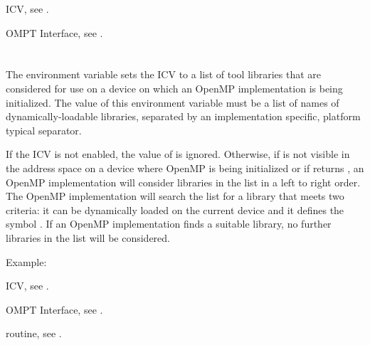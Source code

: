 \begin{crossrefs}
\item {} ICV, see .

\item OMPT Interface, see .
\end{crossrefs}



\section{}
\label{sec:OMP_TOOL_LIBRARIES}

The  environment variable sets the
 ICV to a list of tool libraries that are
considered for use on a device on which an OpenMP implementation
is being initialized. The value of this environment variable must 
be a list of names of dynamically-loadable libraries, separated 
by an implementation specific, platform typical separator.

If the  ICV is not enabled, the value of 
 is ignored. Otherwise, if  
is not visible in the address space on a device where OpenMP is being
initialized or if  returns , an OpenMP 
implementation will consider libraries in the  list
in a left to right order.  The OpenMP implementation will search the list for
a library that meets two criteria: it can be dynamically loaded on the 
current device and it defines the symbol . If an 
OpenMP implementation finds a suitable library, no further libraries in 
the list will be considered.

Example:
\begin{ompEnv}
\end{ompEnv}

\begin{crossrefs}
\item {} ICV, see .

\item OMPT Interface, see .

\item {} routine, see .
\end{crossrefs}



